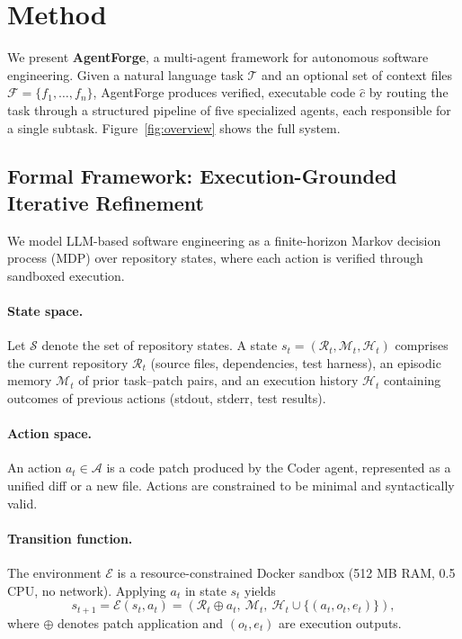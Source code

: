 \documentclass[journal]{IEEEtran}
\begin{document}

\section{Method}
\label{sec:method}

We present \textbf{AgentForge}, a multi-agent framework for autonomous software engineering. Given a natural language task $\mathcal{T}$ and an optional set of context files $\mathcal{F} = \{f_1, \dots, f_n\}$, AgentForge produces verified, executable code $\hat{c}$ by routing the task through a structured pipeline of five specialized agents, each responsible for a single subtask. Figure~\ref{fig:overview} shows the full system.




\subsection{Formal Framework: Execution-Grounded Iterative Refinement}
\label{sec:formal}

We model LLM-based software engineering as a finite-horizon Markov decision process (MDP) over repository states, where each action is verified through sandboxed execution.

\paragraph{State space.}
Let $\mathcal{S}$ denote the set of repository states. A state $s_t = (\mathcal{R}_t, \mathcal{M}_t, \mathcal{H}_t)$ comprises the current repository $\mathcal{R}_t$ (source files, dependencies, test harness), an episodic memory $\mathcal{M}_t$ of prior task--patch pairs, and an execution history $\mathcal{H}_t$ containing outcomes of previous actions (stdout, stderr, test results).

\paragraph{Action space.}
An action $a_t \in \mathcal{A}$ is a code patch produced by the Coder agent, represented as a unified diff or a new file. Actions are constrained to be minimal and syntactically valid.

\paragraph{Transition function.}
The environment $\mathcal{E}$ is a resource-constrained Docker sandbox (512 MB RAM, 0.5 CPU, no network). Applying $a_t$ in state $s_t$ yields
\begin{equation}
    s_{t+1} = \mathcal{E}(s_t, a_t) = (\mathcal{R}_t \oplus a_t,\ \mathcal{M}_t,\ \mathcal{H}_t \cup \{(a_t, o_t, e_t)\}),
\end{equation}
where $\oplus$ denotes patch application and $(o_t, e_t)$ are execution outputs.
\end{document}
